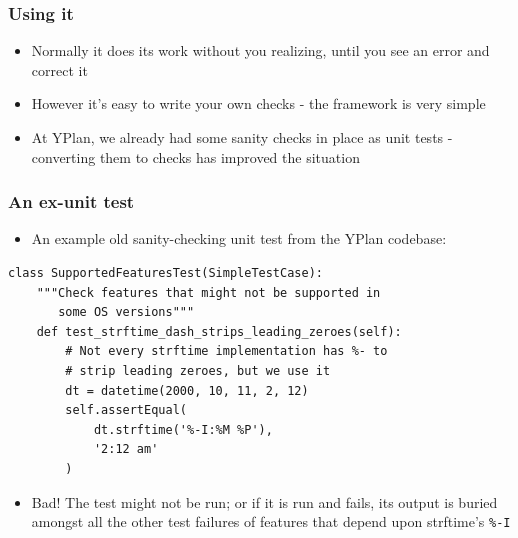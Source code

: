 \documentclass{beamer}
\begin{document}
\begin{frame}[fragile]\frametitle{Using it}

    \begin{itemize}
        \item Normally it does its work without you realizing, until you see an error and correct it
        \item However it's easy to write your own checks - the framework is very simple
        \item At YPlan, we already had some sanity checks in place as unit tests - converting them to checks has improved the situation
    \end{itemize}

\end{frame}


\begin{frame}[fragile]\frametitle{An ex-unit test}

    \begin{itemize}
        \item An example old sanity-checking unit test from the YPlan codebase:
    \end{itemize}

    \begin{lstlisting}
class SupportedFeaturesTest(SimpleTestCase):
    """Check features that might not be supported in
       some OS versions"""
    def test_strftime_dash_strips_leading_zeroes(self):
        # Not every strftime implementation has %- to
        # strip leading zeroes, but we use it
        dt = datetime(2000, 10, 11, 2, 12)
        self.assertEqual(
            dt.strftime('%-I:%M %P'),
            '2:12 am'
        )
    \end{lstlisting}

    \begin{itemize}
        \item Bad! The test might not be run; or if it is run and fails, its output is buried amongst all the other test failures of features that depend upon strftime's \texttt{\%-I}
    \end{itemize}
\end{frame}
\end{document}
